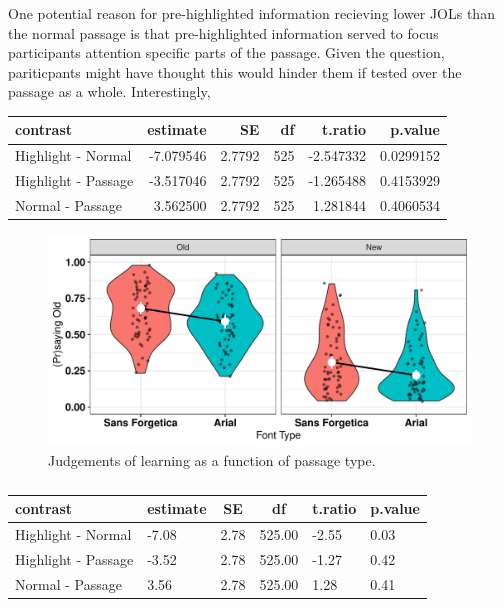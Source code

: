 \documentclass[pdf]{apa6}
\begin{document}
One potential reason for pre-highlighted information recieving lower JOLs than the normal passage is that pre-highlighted information served to focus participants attention specific parts of the passage. Given the question, pariticpants might have thought this would hinder them if tested over the passage as a whole. Interestingly,

\begin{tabular}{l|r|r|r|r|r}
\hline
contrast & estimate & SE & df & t.ratio & p.value\\
\hline
Highlight - Normal & -7.079546 & 2.7792 & 525 & -2.547332 & 0.0299152\\
\hline
Highlight - Passage & -3.517046 & 2.7792 & 525 & -1.265488 & 0.4153929\\
\hline
Normal - Passage & 3.562500 & 2.7792 & 525 & 1.281844 & 0.4060534\\
\hline
\end{tabular}

\begin{figure}

{\centering \includegraphics{SF_Paper_files/figure-latex/unnamed-chunk-5-1} 

}

\caption{Judgements of learning as a function of passage type.}\label{fig:unnamed-chunk-5}
\end{figure}

\begin{table}[tbp]
\begin{center}
\begin{threeparttable}
\caption{\label{tab:unnamed-chunk-5}}
\begin{tabular}{llllll}
\toprule
contrast & \multicolumn{1}{c}{estimate} & \multicolumn{1}{c}{SE} & \multicolumn{1}{c}{df} & \multicolumn{1}{c}{t.ratio} & \multicolumn{1}{c}{p.value}\\
\midrule
Highlight - Normal & -7.08 & 2.78 & 525.00 & -2.55 & 0.03\\
Highlight - Passage & -3.52 & 2.78 & 525.00 & -1.27 & 0.42\\
Normal - Passage & 3.56 & 2.78 & 525.00 & 1.28 & 0.41\\
\bottomrule
\end{tabular}
\end{threeparttable}
\end{center}
\end{table}
\end{document}
